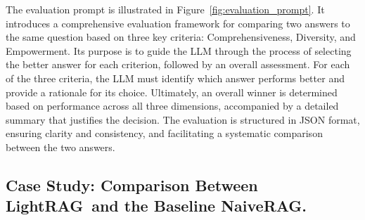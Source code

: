 \documentclass{article} %
\def\model{LightRAG}
\begin{document}
The evaluation prompt is illustrated in Figure~\ref{fig:evaluation_prompt}. It introduces a comprehensive evaluation framework for comparing two answers to the same question based on three key criteria: Comprehensiveness, Diversity, and Empowerment. Its purpose is to guide the LLM through the process of selecting the better answer for each criterion, followed by an overall assessment. For each of the three criteria, the LLM must identify which answer performs better and provide a rationale for its choice. Ultimately, an overall winner is determined based on performance across all three dimensions, accompanied by a detailed summary that justifies the decision. The evaluation is structured in JSON format, ensuring clarity and consistency, and facilitating a systematic comparison between the two answers.

\vspace{-0.1in}
\subsection{Case Study: Comparison Between \model\ and the Baseline NaiveRAG.}
\end{document}
